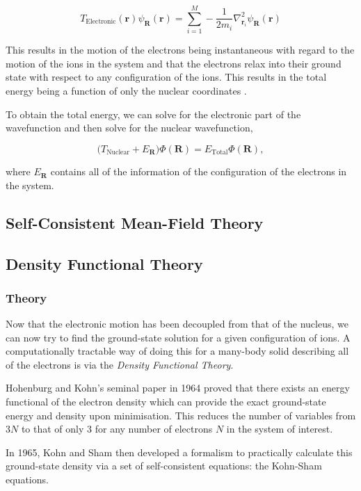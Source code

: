 \documentclass[11pt]{article}
\begin{document}
\[T_{\text{Electronic}}(\mathbf{r}) \psi_{\mathbf{R}}(\mathbf{r}) = \sum_{i =
1}^{M} - \frac{1}{2m_{i}} \nabla^{2}_{\mathbf{r}_{i}}
\psi_{\mathbf{R}}(\mathbf{r}) \]

This results in the motion of the electrons being instantaneous with regard to the
motion of the ions in the system and that the electrons relax into their ground state with
respect to any configuration of the ions. This results in the total energy being a function of
only the nuclear coordinates \cite{Finnis1997}. 

To obtain the total energy, we can solve for the electronic part of the wavefunction and then
solve for the nuclear wavefunction,

\[ \Big( T_{\text{Nuclear}} + E_{\mathbf{R}} \Big) \Phi(\mathbf{R}) = E_{\text{Total}} \Phi(\mathbf{R}),\]

where \(E_{\mathbf{R}}\) contains all of the information of the configuration of the electrons in
the system. 

\subsection{Self-Consistent Mean-Field Theory}
\label{sec:org222993f}

\subsection{Density Functional Theory}
\label{sec:orgd48a9a2}

\subsubsection{Theory}
\label{sec:org83bcfd2}

Now that the electronic motion has been decoupled from that of the nucleus, we can now try to
find the ground-state solution for a given configuration of ions. A computationally tractable
way of doing this for a many-body solid describing all of the electrons is via the \emph{Density
Functional Theory}. 

Hohenburg and Kohn's seminal paper in 1964 proved that there exists an energy functional of the
electron density which can provide the exact ground-state energy and density upon
minimisation. This reduces the number of variables from \(3N\) to that of only 3 for any number
of electrons \(N\) in the system of interest.

In 1965, Kohn and Sham then developed a formalism to practically calculate this ground-state density via
a set of self-consistent equations: the Kohn-Sham equations. 
\end{document}
